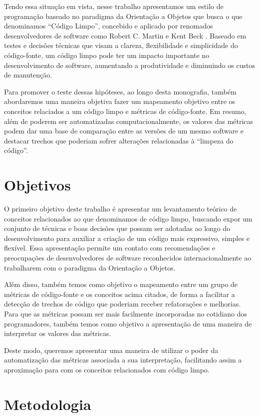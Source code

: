 Tendo essa situação em vista, nesse trabalho apresentamos um estilo de programação baseado
no paradigma da Orientação a Objetos que busca o que denominamos ``Código Limpo'', concebido e aplicado por renomados desenvolvedores de software
como Robert C. Martin \cite{} e Kent Beck \cite{}. Baseado em testes e decisões técnicas que visam a clareza, flexibilidade
e simplicidade do código-fonte, um código limpo pode ter um impacto importante no desenvolvimento 
de software, aumentando a produtividade e diminuindo os custos de manutenção.

Para promover o teste dessas hipóteses, ao longo desta monografia, também abordaremos uma maneira objetiva fazer um mapeamento objetivo 
entre os conceitos relaciados a um código limpo e métricas de código-fonte. Em resumo, além de poderem ser
automatizadas computacionalmente, os valores das métricas podem dar uma base de comparação entre
as versões de um mesmo software e destacar trechos que poderiam sofrer alterações relacionadas à ``limpeza do código''.

\section{Objetivos}
\label{sec:objetivo}


O primeiro objetivo deste trabalho é apresentar um levantamento teórico de conceitos relacionados ao que denominamos de 
código limpo, buscando expor um conjunto de técnicas e boas decisões que possam ser adotadas ao longo do 
desenvolvimento para auxiliar a criação de um código mais expressivo, simples e flexível. Essa apresentação permite um 
contato com recomendações e preocupações de desenvolvedores de software reconhecidos internacionalmente ao trabalharem com 
o paradigma da Orientação a Objetos.

Além disso, também temos como objetivo o mapeamento entre um grupo de métricas de código-fonte e os conceitos acima 
citados, de forma a facilitar a detecção de trechos de código que poderiam receber refatorações e melhorias. Para que as 
métricas possam ser mais facilmente incorporadas no cotidiano dos programadores, também temos como objetivo a apresentação 
de uma maneira de interpretar os valores das métricas.

Deste modo, queremos apresentar uma maneira de utilizar o poder da automatização das métricas associada a sua interpretação, facilitando assim a aproximação para com os conceitos relacionados com código limpo.

\section{Metodologia}
\label{sec:metodologia}

